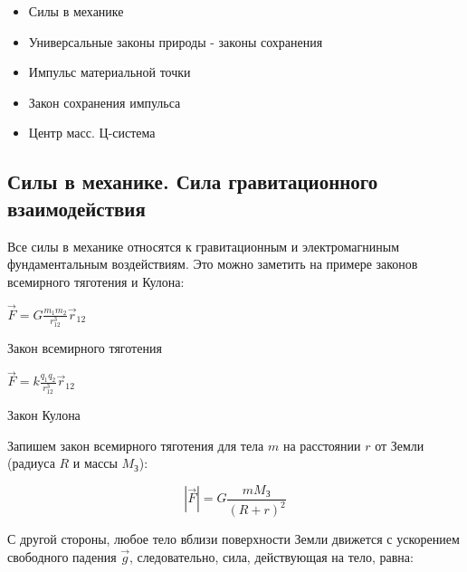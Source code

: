 \documentclass[12pt]{article}
\begin{document}
    \begin{tcolorbox}[colframe=blue!25, colback=blue!10, title=\textbf{План лекции}]

        \footnotesize
        \begin{itemize}
            \item Силы в механике

            \item Универсальные законы природы - законы сохранения

            \item Импульс материальной точки

            \item Закон сохранения импульса

            \item Центр масс. Ц-система
        \end{itemize}
    \end{tcolorbox}

    \subsection{Силы в механике. Сила гравитационного взаимодействия}

    Все силы в механике относятся к гравитационным и электромагниным фундаментальным воздействиям.
    Это можно заметить на примере законов всемирного тяготения и Кулона:

    \begin{multicols}{2}
        \begin{center}
            $\vec{F} = G \frac{m_1 m_2}{r^3_{12}} \vec{r}_{12}$

            Закон всемирного тяготения
        \end{center}

        \begin{center}
            $\vec{F} = k \frac{q_1 q_2}{r^3_{12}} \vec{r}_{12}$

            Закон Кулона
        \end{center}
    \end{multicols}

    Запишем закон всемирного тяготения для тела $m$ на расстоянии $r$ от Земли (радиуса $R$ и массы $M_{\text{З}}$):

    \[|\vec{F}| = G\frac{mM_{\text{З}}}{(R + r)^2}\]

    С другой стороны, любое тело вблизи поверхности Земли движется с ускорением свободного падения $\vec{g}$, следовательно,
    сила, действующая на тело, равна:
\end{document}
